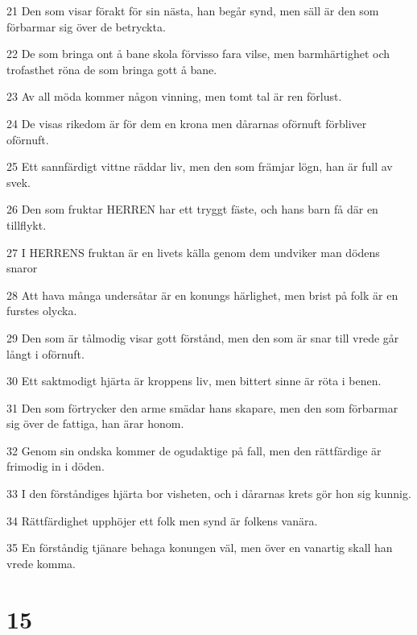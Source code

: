 \par 21 Den som visar förakt för sin nästa, han begår synd, men säll är den som förbarmar sig över de betryckta.
\par 22 De som bringa ont å bane skola förvisso fara vilse, men barmhärtighet och trofasthet röna de som bringa gott å bane.
\par 23 Av all möda kommer någon vinning, men tomt tal är ren förlust.
\par 24 De visas rikedom är för dem en krona men dårarnas oförnuft förbliver oförnuft.
\par 25 Ett sannfärdigt vittne räddar liv, men den som främjar lögn, han är full av svek.
\par 26 Den som fruktar HERREN har ett tryggt fäste, och hans barn få där en tillflykt.
\par 27 I HERRENS fruktan är en livets källa genom dem undviker man dödens snaror
\par 28 Att hava många undersåtar är en konungs härlighet, men brist på folk är en furstes olycka.
\par 29 Den som är tålmodig visar gott förstånd, men den som är snar till vrede går långt i oförnuft.
\par 30 Ett saktmodigt hjärta är kroppens liv, men bittert sinne är röta i benen.
\par 31 Den som förtrycker den arme smädar hans skapare, men den som förbarmar sig över de fattiga, han ärar honom.
\par 32 Genom sin ondska kommer de ogudaktige på fall, men den rättfärdige är frimodig in i döden.
\par 33 I den förståndiges hjärta bor visheten, och i dårarnas krets gör hon sig kunnig.
\par 34 Rättfärdighet upphöjer ett folk men synd är folkens vanära.
\par 35 En förståndig tjänare behaga konungen väl, men över en vanartig skall han vrede komma.

\chapter{15}

